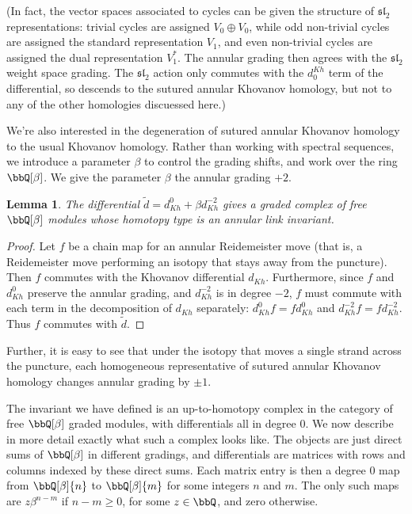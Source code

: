 \documentclass{amsart}
\theoremstyle{plain}
\newtheorem{lem}[prop]{Lemma}
\newcommand{\fsl}{\mathfrak{sl}_2}
\begin{document}
(In fact, the vector spaces associated to cycles can be given the structure of $\fsl$ representations: trivial cycles are assigned $V_0 \oplus V_0$, while odd non-trivial cycles are assigned the standard representation $V_1$, and even non-trivial cycles are assigned the dual representation $V_1^*$. The annular grading then agrees with the $\fsl$ weight space grading. The $\fsl$ action only commutes with the $d^{Kh}_0$ term of the differential, so descends to the sutured annular Khovanov homology, but not to any of the other homologies discuessed here.)

We're also interested in the degeneration of sutured annular Khovanov homology to the usual Khovanov homology. Rather than working with spectral sequences, we introduce a parameter $\beta$ to control the grading shifts, and work over the ring $\bbQ[\beta]$. We give the parameter $\beta$ the annular grading $+2$. 

\begin{lem}
The differential $\tilde{d}=d_{Kh}^0 + \beta d_{Kh}^{-2}$ gives a graded complex of free $\bbQ[\beta]$ modules whose homotopy type is an annular link invariant.
\end{lem}

\begin{proof}
Let $f$ be a chain map for an annular Reidemeister move (that is, a Reidemeister move performing an isotopy that stays away from the puncture).  Then $f$ commutes with the Khovanov differential $d_{Kh}$.  Furthermore, since $f$ and $d_{Kh}^0$ preserve the annular grading, and $d_{Kh}^{-2}$ is in degree $-2$, $f$ must commute with each term in the decomposition of $d_{Kh}$ separately: $d_{Kh}^0 f= f d_{Kh}^0$ and $d_{Kh}^{-2} f = f d_{Kh}^{-2}$.  Thus $f$ commutes with $\tilde{d}$.
\end{proof}

Further, it is easy to see that under the isotopy that moves a single strand across the puncture, each homogeneous representative of sutured annular Khovanov homology changes annular grading by $\pm 1$.

The invariant we have defined is an up-to-homotopy complex in the category of free $\bbQ[\beta]$ graded modules, with differentials all in degree 0. We now describe in more detail exactly what such a complex looks like.
The objects are just direct sums of $\bbQ[\beta]$ in different gradings, and differentials are matrices with rows and columns indexed by these direct sums. Each matrix entry is then a degree 0 map from $\bbQ[\beta]\{n\}$ to $\bbQ[\beta]\{m\}$ for some integers $n$ and $m$. The only such maps are $z \beta^{n-m}$ if $n-m \geq 0$, for some $z \in \bbQ$, and zero otherwise.
\end{document}
